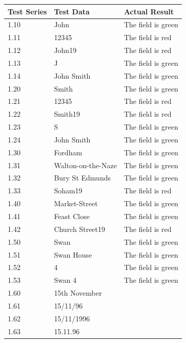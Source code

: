\begin{center}
    \begin{longtable}{|p{2cm}|p{5cm}|p{8cm}|}
        \hline
        \textbf{Test Series} & \textbf{Test Data} & \textbf{Actual Result}\\ \hline
        1.10 & John & The field is green \\ \hline
        1.11 & 12345 &  The field is red \\ \hline
        1.12 & John19 &  The field is red \\ \hline
        1.13 & J &  The field is green \\ \hline
        1.14 & John Smith & The field is green \\ \hline
        
        1.20 & Smith &  The field is green \\ \hline
        1.21 & 12345 &   The field is red \\ \hline
        1.22 & Smith19 &  The field is red \\ \hline
        1.23 & S &  The field is green \\ \hline
        1.24 & John Smith & The field is green \\ \hline
        
        1.30 & Fordham &  The field is green \\ \hline
        1.31 & Walton-on-the-Naze &  The field is green \\ \hline
        1.32 & Bury St Edmunds &  The field is green \\ \hline
        1.33 & Soham19 &  The field is red \\ \hline

        1.40 & Market-Street &  The field is green \\ \hline
        1.41 & Feast Close & The field is green \\ \hline
        1.42 & Church Street19 & The field is red \\ \hline
        
        1.50 & Swan & The field is green \\ \hline
        1.51 & Swan House & The field is green \\ \hline
        1.52 & 4 & The field is green \\ \hline
        1.53 & Swan 4 & The field is green \\ \hline
        
        \rowcolor{darkgrey} 1.60 & 15th November &  \\ \hline
        \rowcolor{darkgrey} 1.61 & 15/11/96 & \\ \hline
        \rowcolor{darkgrey} 1.62 & 15/11/1996 &  \\ \hline
        \rowcolor{darkgrey} 1.63 & 15.11.96 & \\ \hline
        

\end{longtable}
\end{center}
